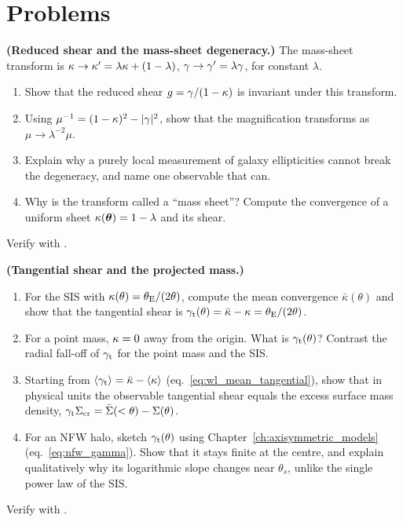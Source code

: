\section{Problems}
\label{sec:wl_problems}

\begin{exercise}
\label{ex:wl_mst}
\textbf{(Reduced shear and the mass-sheet degeneracy.)}
The mass-sheet transform is $\kappa \to \kappa' = \lambda\kappa +
(1-\lambda)$, $\gamma \to \gamma' = \lambda\gamma$, for constant
$\lambda$.
\begin{enumerate}[label=(\alph*)]
    \item Show that the reduced shear $g = \gamma/(1-\kappa)$ is
          invariant under this transform.
    \item Using $\mu^{-1} = (1-\kappa)^2 - |\gamma|^2$, show that the
          magnification transforms as $\mu \to \lambda^{-2}\mu$.
    \item Explain why a purely local measurement of galaxy ellipticities
          cannot break the degeneracy, and name one observable that can.
    \item Why is the transform called a ``mass sheet''?  Compute the
          convergence of a uniform sheet
          $\kappa(\boldsymbol{\theta}) = 1-\lambda$ and its shear.
\end{enumerate}
Verify with
.
\end{exercise}

\begin{exercise}
\label{ex:wl_tangential}
\textbf{(Tangential shear and the projected mass.)}
\begin{enumerate}[label=(\alph*)]
    \item For the SIS with $\kappa(\theta) = \theta_{\mathrm{E}}/(2\theta)$, compute
          the mean convergence $\bar\kappa(\theta)$ and show that the
          tangential shear is $\gamma_{\mathrm t}(\theta) =
          \bar\kappa - \kappa = \theta_{\mathrm{E}}/(2\theta)$.
    \item For a point mass, $\kappa = 0$ away from the origin.  What is
          $\gamma_{\mathrm t}(\theta)$?  Contrast the radial fall-off of
          $\gamma_{\mathrm t}$ for the point mass and the SIS.
    \item Starting from $\langle\gamma_{\mathrm t}\rangle = \bar\kappa -
          \langle\kappa\rangle$ (eq.~\ref{eq:wl_mean_tangential}), show
          that in physical units the observable tangential shear equals
          the excess surface mass density,
          $\gamma_{\mathrm t}\Sigma_{\mathrm{cr}} = \bar\Sigma(<\theta) -
          \Sigma(\theta)$.
    \item For an NFW halo, sketch $\gamma_{\mathrm t}(\theta)$ using
          Chapter~\ref{ch:axisymmetric_models} (eq.~\ref{eq:nfw_gamma}).
          Show that it stays finite at the centre, and explain
          qualitatively why its logarithmic slope changes near $\theta_s$,
          unlike the single power law of the SIS.
\end{enumerate}
Verify with
.
\end{exercise}

